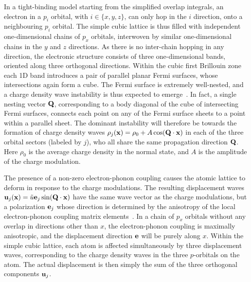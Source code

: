 \documentclass[aps,prl,twocolumn,superscriptaddress,groupedaddress]{revtex4}
\begin{document}
In a tight-binding model starting from the simplified overlap integrals, an electron in a $p_i$ orbital, with $i \in \{x,y,z\}$, can only hop in the $i$ direction, onto a neighbouring $p_i$ orbital. The simple cubic lattice is thus filled with independent one-dimensional chains of $p_x$ orbitals, interwoven by similar one-dimensional chains in the $y$ and $z$ directions. As there is no inter-chain hopping in any direction, the electronic structure consists of three one-dimensional bands, oriented along three orthogonal directions. Within the cubic first Brillouin zone each 1D band introduces a pair of parallel planar Fermi surfaces, whose intersections again form a cube. The Fermi surface is extremely well-nested, and a charge density wave instability is thus expected to emerge~\cite{Peierls}. In fact, a single nesting vector ${\bf Q}$, corresponding to a body diagonal of the cube of intersecting Fermi surfaces, connects each point on any of the Fermi surface sheets to a point within a parallel sheet. The dominant instability will therefore be towards the formation of charge density waves $\rho_j({\bf x}) = \rho_0 + A \cos({\bf Q} \cdot {\bf x})$ in each of the three orbital sectors (labeled by $j$), who all share the same propagation direction ${\bf Q}$. Here $\rho_0$ is the average charge density in the normal state, and $A$ is the amplitude of the charge modulation.

The presence of a non-zero electron-phonon coupling causes the atomic lattice to deform in response to the charge modulations. The resulting displacement waves ${\bf u}_j({\bf x}) = \tilde{u} {\bf e}_j \sin({\bf Q} \cdot {\bf x})$ have the same wave vector as the charge modulations, but a polarization ${\bf e}_j$ whose direction is determined by the anisotropy of the local electron-phonon coupling matrix elements~\cite{vanwezel}. In a chain of $p_x$ orbitals without any overlap in directions other than $x$, the electron-phonon coupling is maximally anisotropic, and the displacement direction ${\bf e}$ will be purely along $x$. Within the simple cubic lattice, each atom is affected simultaneously by three displacement waves, corresponding to the charge density waves in the three $p$-orbitals on the atom. The actual displacement is then simply the sum of the three orthogonal components ${\bf u}_j$. 
\end{document}

